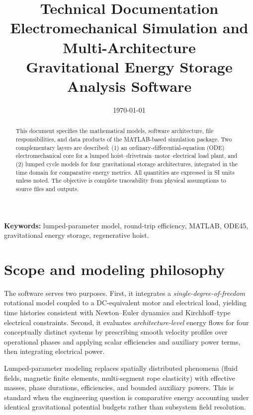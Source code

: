 \documentclass[11pt,a4paper]{article}
\title{\vspace{-1.2em}\textbf{Technical Documentation}\\[0.35em]
\large Electromechanical Simulation and Multi-Architecture\\Gravitational Energy Storage Analysis Software}
\author{}
\date{\today}
\begin{document}
\maketitle
\thispagestyle{empty}

\begin{abstract}
This document specifies the mathematical models, software architecture, file responsibilities, and data products of the MATLAB-based simulation package. Two complementary layers are described: (1) an ordinary-differential-equation (ODE) electromechanical core for a lumped hoist--drivetrain--motor--electrical load plant, and (2) lumped cycle models for four gravitational storage architectures, integrated in the time domain for comparative energy metrics. All quantities are expressed in SI units unless noted. The objective is complete traceability from physical assumptions to source files and outputs.
\end{abstract}

\vspace{0.8em}
\noindent\textbf{Keywords:} lumped-parameter model, round-trip efficiency, MATLAB, ODE45, gravitational energy storage, regenerative hoist.

\tableofcontents
\newpage

\section{Scope and modeling philosophy}

The software serves two purposes. First, it integrates a \emph{single-degree-of-freedom} rotational model coupled to a DC-equivalent motor and electrical load, yielding time histories consistent with Newton--Euler dynamics and Kirchhoff--type electrical constraints. Second, it evaluates \emph{architecture-level} energy flows for four conceptually distinct systems by prescribing smooth velocity profiles over operational phases and applying scalar efficiencies and auxiliary power terms, then integrating electrical power.

Lumped-parameter modeling replaces spatially distributed phenomena (fluid fields, magnetic finite elements, multi-segment rope elasticity) with effective masses, phase durations, efficiencies, and bounded auxiliary powers. This is standard when the engineering question is comparative energy accounting under identical gravitational potential budgets rather than subsystem field resolution.
\end{document}
